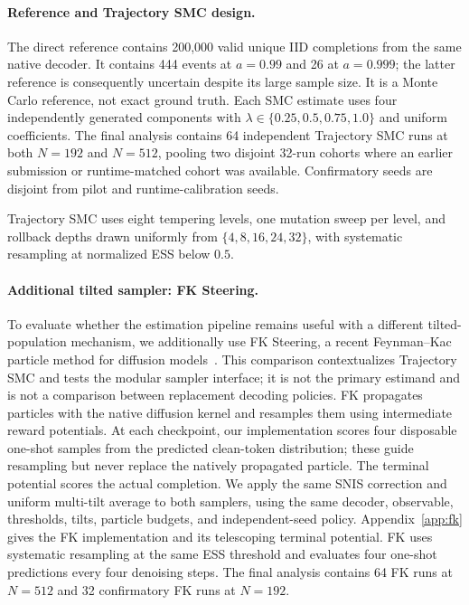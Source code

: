 \documentclass{article}
\begin{document}
\paragraph{Reference and Trajectory SMC design.}
The direct reference contains 200,000 valid unique IID completions from the
same native decoder. It contains 444 events at $a=0.99$ and 26 at $a=0.999$;
the latter reference is consequently uncertain despite its large sample size.
It is a Monte Carlo reference, not exact ground truth. Each SMC estimate uses
four independently generated components with
\(
\lambda\in\{0.25,0.5,0.75,1.0\}
\)
and uniform coefficients. The final analysis contains 64 independent
Trajectory SMC runs at both $N=192$ and $N=512$, pooling two disjoint 32-run
cohorts where an earlier submission or runtime-matched cohort was available.
Confirmatory seeds are disjoint from pilot and runtime-calibration seeds.

Trajectory SMC uses eight tempering levels, one mutation sweep per level, and
rollback depths drawn uniformly from $\{4,8,16,24,32\}$, with systematic
resampling at normalized ESS below $0.5$.

\paragraph{Additional tilted sampler: FK Steering.}
To evaluate whether the estimation pipeline remains useful with a different
tilted-population mechanism, we additionally use FK Steering, a recent
Feynman--Kac particle method for diffusion models~\citep{singhal2025fk}. This
comparison contextualizes Trajectory SMC and tests the modular sampler
interface; it is not the primary estimand and is not a comparison between
replacement decoding policies. FK propagates particles with the native
diffusion kernel and resamples them using intermediate reward potentials. At
each checkpoint, our implementation scores four disposable one-shot samples
from the predicted clean-token distribution; these guide resampling but never
replace the natively propagated particle. The terminal potential scores the
actual completion. We apply the same SNIS correction and uniform multi-tilt
average to both samplers, using the same decoder, observable, thresholds,
tilts, particle budgets, and independent-seed policy. Appendix~\ref{app:fk}
gives the FK implementation and its telescoping terminal potential. FK uses
systematic resampling at the same ESS threshold and evaluates four one-shot
predictions every four denoising steps. The final analysis contains 64 FK runs
at $N=512$ and 32 confirmatory FK runs at $N=192$.
\end{document}
